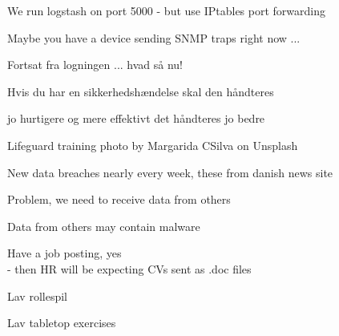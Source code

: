 \documentclass[Screen16to9,17pt]{foils}
\begin{document}
\begin{list2}
\item We run logstash on port 5000 - but use IPtables port forwarding
\end{list2}

Maybe you have a device sending SNMP traps right now ...





\begin{list2}
\item Fortsat fra logningen ... hvad så nu!
\item Hvis du har en sikkerhedshændelse skal den håndteres
\item jo hurtigere og mere effektivt det håndteres jo bedre
\end{list2}

Lifeguard training photo by Margarida CSilva on Unsplash



New data breaches nearly every week, these from danish news site 

Problem, we need to receive data from others

Data from others may contain malware

Have a job posting, yes\\
- then HR will be expecting CVs sent as .doc files


\begin{list2}
\item Lav rollespil
\item Lav tabletop exercises
\end{list2}



\begin{center}
\hlkbig

\myname

\end{center}
\end{document}
